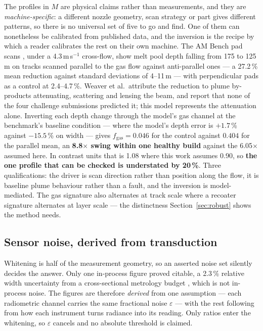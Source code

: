 \documentclass[preprint,times]{elsarticle}
\begin{document}
The profiles in $M$ are physical claims rather than measurements, and they are
\emph{machine-specific}: a different nozzle geometry, scan strategy or part gives
different patterns, so there is no universal set of five to go and find. One of
them can nonetheless be calibrated from published data, and the inversion is the
recipe by which a reader calibrates the rest on their own machine. The AM Bench pad scans \cite{Weaver2024}, under a 4.3\,m\,s$^{-1}$ cross-flow,
show melt pool depth falling from 175 to 125\,\textmu m on tracks scanned
parallel to the gas flow against anti-parallel ones --- a 27.2\,\% mean
reduction against standard deviations of 4--11\,\textmu m --- with perpendicular pads as a control at 2.4--4.7\,\%. Weaver et al.\ attribute
the reduction to plume by-products attenuating, scattering and lensing the beam,
and report that none of the four challenge submissions predicted it; this model
represents the attenuation alone. Inverting each depth change
through the model's gas channel at the benchmark's baseline condition --- where
the model's depth error is $+1.7$\,\% against $-15.5$\,\% on width --- gives
$f_{\mathrm{gas}}=0.046$ for the control against $0.404$ for the parallel mean,
an \textbf{8.8$\times$ swing within one healthy build} against the 6.05$\times$
assumed here. In contrast units that is 1.08 where this work assumes 0.90, so
\textbf{the one profile that can be checked is understated by 20\,\%}. Three qualifications: the driver is scan direction rather than position along the
flow, it is baseline plume behaviour rather than a fault, and the inversion is
model-mediated. The gas signature also alternates at track scale where a recoater
signature alternates at layer scale --- the distinctness
Section~\ref{sec:robust} shows the method needs.

\subsection{Sensor noise, derived from transduction}
\label{sec:noise}

Whitening is half of the measurement geometry, so an asserted noise set silently
decides the answer. Only one in-process figure proved citable, a 2.3\,\% relative
width uncertainty from a cross-sectional metrology budget \cite{Weaver2024},
which is not in-process noise. The figures are therefore \emph{derived} from one
assumption --- each radiometric channel carries the same fractional noise
$\varepsilon$ --- with the rest following from how each instrument turns radiance
into its reading. Only ratios enter the whitening, so $\varepsilon$ cancels and
no absolute threshold is claimed.
\end{document}
